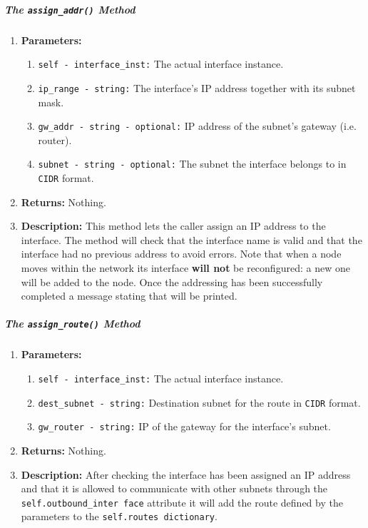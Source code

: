         \subparagraph{The \texttt{assign\_addr()} Method}
            \begin{enumerate}
                \item \textbf{Parameters:}
                \begin{enumerate}
                    \item \texttt{self - interface\_inst:} The actual interface instance.
                    \item \texttt{ip\_range - string:} The interface's IP address together with its subnet mask.
                    \item \texttt{gw\_addr - string - optional:} IP address of the subnet's gateway (i.e. router).
                    \item \texttt{subnet - string - optional:} The subnet the interface belongs to in \texttt{CIDR} format.
                \end{enumerate}
                \item \textbf{Returns:} Nothing.
                \item \textbf{Description:} This method lets the caller assign an IP address to the interface. The method will check that the interface name is valid and that the interface had no previous address to avoid errors. Note that when a node moves within the network its interface \textbf{will not} be reconfigured: a new one will be added to the node. Once the addressing has been successfully completed a message stating that will be printed.
            \end{enumerate}

        \subparagraph{The \texttt{assign\_route()} Method}
            \begin{enumerate}
                \item \textbf{Parameters:}
                \begin{enumerate}
                    \item \texttt{self - interface\_inst:} The actual interface instance.
                    \item \texttt{dest\_subnet - string:} Destination subnet for the route in \texttt{CIDR} format.
                    \item \texttt{gw\_router - string:} IP of the gateway for the interface's subnet.
                \end{enumerate}
                \item \textbf{Returns:} Nothing.
                \item \textbf{Description:} After checking the interface has been assigned an IP address and that it is allowed to communicate with other subnets through the \texttt{self.outbound\_inter face} attribute it will add the route defined by the parameters to the \texttt{self.routes dictionary}.
            \end{enumerate}

